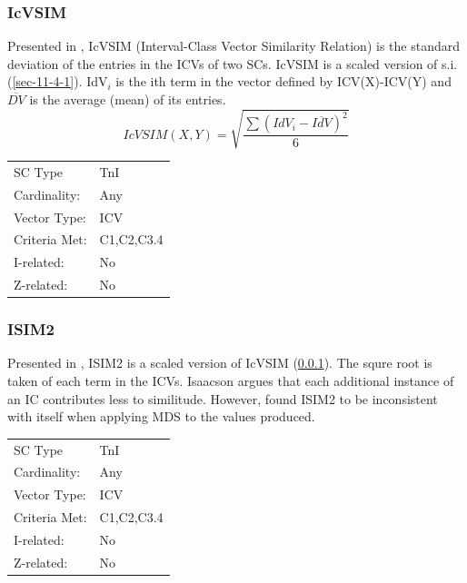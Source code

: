 \documentclass{article}
\begin{document}
\subsubsection{IcVSIM}
\label{sec-11-7-2}

Presented in \citet[pp. 18]{Isaacson1990}, IcVSIM (Interval-Class
Vector Similarity Relation) is the standard deviation of the entries
in the ICVs of two SCs. IcVSIM is a scaled version of
s.i. (\ref{sec-11-4-1}). IdV$_{i}$ is the ith term in the vector defined by
ICV(X)-ICV(Y) and $\overline{DV}$ is the average (mean) of its
entries.
$$IcVSIM(X,Y)=\sqrt{\frac{\sum(IdV_{i}-\overline{IdV})^{2}}{6}}$$

\begin{center}
\begin{tabular}{ll}
 SC Type        &  TnI         \\
 Cardinality:   &  Any         \\
 Vector Type:   &  ICV         \\
 Criteria Met:  &  C1,C2,C3.4  \\
 I-related:     &  No          \\
 Z-related:     &  No          \\
\end{tabular}
\end{center}
\subsubsection{ISIM2}
\label{sec-11-7-3}

Presented in \citet{Isaacson1996}, ISIM2 is a scaled version of IcVSIM
(\ref{sec-11-7-2}). The squre root is taken of each term in the ICVs. Isaacson
argues that each additional instance of an IC contributes less to
similitude. However, \citet{Samplaski2005a} found ISIM2 to be
inconsistent with itself when applying MDS to the values produced.

\begin{center}
\begin{tabular}{ll}
 SC Type        &  TnI         \\
 Cardinality:   &  Any         \\
 Vector Type:   &  ICV         \\
 Criteria Met:  &  C1,C2,C3.4  \\
 I-related:     &  No          \\
 Z-related:     &  No          \\
\end{tabular}
\end{center}
\end{document}
